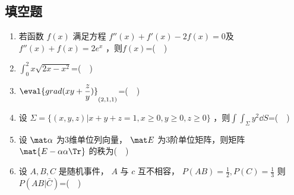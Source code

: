 \subsection{填空题}
\begin{enumerate}
\item 若函数 $f(x)$  满足方程 $f''(x)+f'(x)-2f(x)=0$及$f''(x)+f(x)=2e^x$ ，则$f(x)$=($\quad$)
\item $\displaystyle \int_{0}^{2} x\sqrt{2x-x^2}$=($\quad$)
\item $\displaystyle \eval{ grad(xy+\frac{z}{y})}_{(2,1,1)}$=($\quad$)
\item  设 $\Sigma=\{(x,y,z)|x+y+z=1,x\ge 0,y \ge 0,z \ge 0\}$  ，则$\displaystyle \int \int_\Sigma y^2\dd{S}$=($\quad$)
\item 设 $\mat \alpha$ 为3维单位列向量， $\mat E$ 为3阶单位矩阵，则矩阵 $\mat {E-\alpha\alpha \Tr}$ 的秩为($\quad$)
\item 设 $A,B,C$ 是随机事件， $A$ 与 $c$ 互不相容， $P(AB)=\frac{1}{2},P(C)=\frac{1}{3}$  则 $P(AB|\bar C)$=($\quad$)
\end{enumerate}
